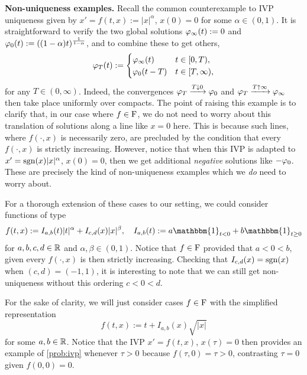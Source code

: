 \vspace{3mm}\textbf{Non-uniqueness examples.} Recall the common counterexample to IVP uniqueness given by $x'=f(t,x):=|x|^\alpha$, $x(0)=0$ for some $\alpha\in(0,1)$. It is straightforward to verify the two global solutions $\varphi_\infty(t):=0$ and $\varphi_0(t):=((1-\alpha)t)^\frac{1}{1-\alpha}$, and to combine these to get others,
\begin{equation}\label{eq:standard_nonunique}
    \varphi_T(t) :=
    \begin{cases}
        \varphi_\infty(t) & t\in[0,T),\\
        \varphi_0(t-T) & t\in[T,\infty),
    \end{cases}
\end{equation}
for any $T\in(0,\infty)$. Indeed, the convergences $\varphi_T\xrightarrow{T\downarrow 0}\varphi_0$ and  $\varphi_T\xrightarrow{T\uparrow\infty}\varphi_\infty$ then take place uniformly over compacts. The point of raising this example is to clarify that, in our case where $f\in\mathrm{F}$, we do not need to worry about this translation of solutions along a line like $x=0$ here. This is because such lines, where $f(\cdot,x)$ is necessarily zero, are precluded by the condition that every $f(\cdot,x)$ is strictly increasing. However, notice that when this IVP is adapted to $x'=\mathrm{sgn}(x)|x|^\alpha$, $x(0)=0$, then we get additional \emph{negative} solutions like $-\varphi_0$. These are precisely the kind of non-uniqueness examples which we \emph{do} need to worry about.

For a thorough extension of these cases to our setting, we could consider functions of type
\begin{equation}
    f(t,x) := I_{a,b}(t)|t|^\alpha + I_{c,d}(x)|x|^\beta,\quad I_{a,b}(t):=a\mathbbm{1}_{t<0} + b\mathbbm{1}_{t\ge0}
\end{equation}
for $a,b,c,d\in\mathbb{R}$ and $\alpha,\beta\in(0,1)$. Notice that $f\in\mathrm{F}$ provided that $a<0<b$, given every $f(\cdot,x)$ is then strictly increasing. Checking that $I_{c,d}(x)=\mathrm{sgn}(x)$ when $(c,d)=(-1,1)$, it is interesting to note that we can still get non-uniqueness without this ordering $c<0<d$.

For the sake of clarity, we will just consider cases $f\in\mathrm{F}$ with the simplified representation
\begin{equation}\label{eq:nonunique_example}
    f(t,x) := t + I_{a,b}(x)\sqrt{|x|}
\end{equation}
for some $a,b\in\mathbb{R}$. Notice that the IVP $x'=f(t,x)$, $x(\tau)=0$ then provides an example of \autoref{prob:ivp} whenever $\tau>0$ because $f(\tau,0)=\tau>0$, contrasting $\tau=0$ given $f(0,0)=0$.

